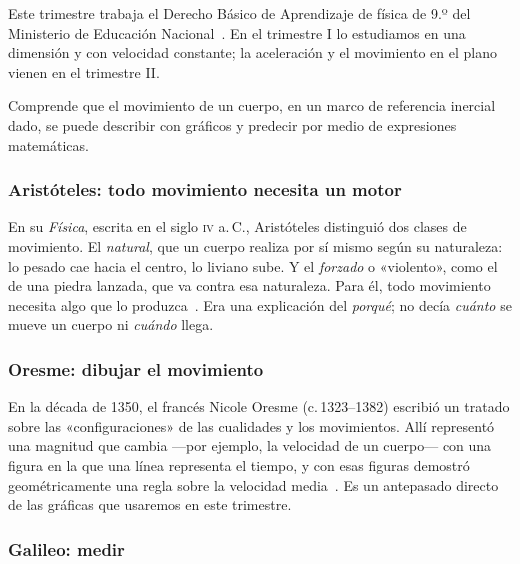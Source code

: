 \documentclass[11pt]{article}
\begin{document}
Este trimestre trabaja el Derecho Básico de Aprendizaje de física de 9.º del Ministerio de
Educación Nacional~\cite{mendba}. En el trimestre I lo estudiamos en una dimensión y con
velocidad constante; la aceleración y el movimiento en el plano vienen en el trimestre II.

\begin{dba}
Comprende que el movimiento de un cuerpo, en un marco de referencia inercial dado, se puede
describir con gráficos y predecir por medio de expresiones matemáticas.
\end{dba}


\subsubsection*{Aristóteles: todo movimiento necesita un motor}

En su \emph{Física}, escrita en el siglo \textsc{iv} a.\,C., Aristóteles distinguió dos clases
de movimiento. El \emph{natural}, que un cuerpo realiza por sí mismo según su naturaleza: lo
pesado cae hacia el centro, lo liviano sube. Y el \emph{forzado} o «violento», como el de una
piedra lanzada, que va contra esa naturaleza. Para él, todo movimiento necesita algo que lo
produzca~\cite{sepAristoteles}. Era una explicación del \emph{porqué}; no decía \emph{cuánto}
se mueve un cuerpo ni \emph{cuándo} llega.

\subsubsection*{Oresme: dibujar el movimiento}

En la década de 1350, el francés Nicole Oresme (c.\,1323--1382) escribió un tratado sobre las
«configuraciones» de las cualidades y los movimientos. Allí representó una magnitud que
cambia ---por ejemplo, la velocidad de un cuerpo--- con una figura en la que una línea
representa el tiempo, y con esas figuras demostró geométricamente una regla sobre la
velocidad media~\cite{oresme}. Es un antepasado directo de las gráficas que usaremos en este
trimestre.

\subsubsection*{Galileo: medir}
\end{document}
